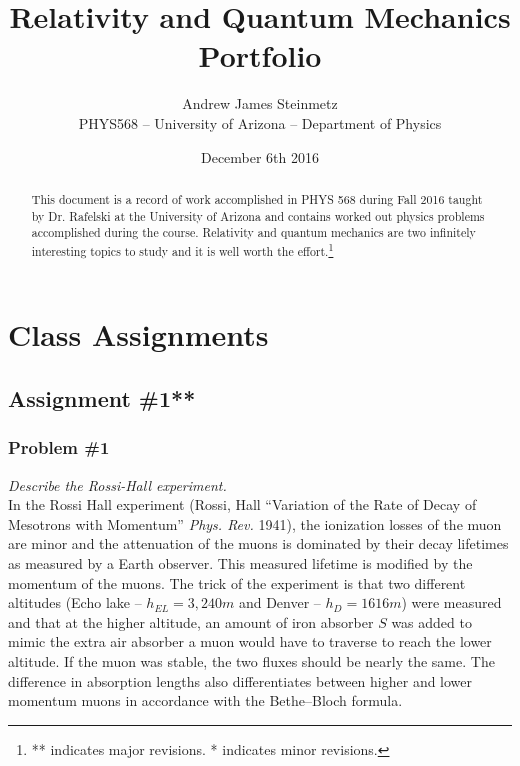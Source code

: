 \documentclass[]{article}
\numberwithin{equation}{subsection}
\begin{document}
\linespread{0.5}

\title{Relativity and Quantum Mechanics Portfolio}
\author{Andrew James Steinmetz\\ PHYS568 -- University of Arizona -- Department of Physics}
\date{December 6th 2016}
\maketitle
\renewcommand{\abstractname}{Foreword}
\begin{abstract}
This document is a record of work accomplished in PHYS 568 during Fall 2016 taught by Dr. Rafelski at the University of Arizona and contains worked out physics problems accomplished during the course. Relativity and quantum mechanics are two infinitely interesting topics to study and it is well worth the effort.\let\thefootnote\relax\footnote{** indicates major revisions. * indicates minor revisions.}

\end{abstract}
\tableofcontents
\section{Class Assignments}
\subsection{Assignment \#1**}
\subsubsection*{Problem \#1}
\emph{Describe the Rossi-Hall experiment.}\\

\noindent In the Rossi Hall experiment (Rossi, Hall ``Variation of the Rate of Decay of Mesotrons with Momentum'' \emph{Phys. Rev.} 1941), the ionization losses of the muon are minor and the attenuation of the muons is dominated by their decay lifetimes as measured by a Earth observer. This measured lifetime is modified by the momentum of the muons. The trick of the experiment is that two different altitudes (Echo lake -- $h_{EL}=3,240m$ and Denver -- $h_{D}=1616m$) were measured and that at the higher altitude, an amount of iron absorber $S$ was added to mimic the extra air absorber a muon would have to traverse to reach the lower altitude. If the muon was stable, the two fluxes should be nearly the same. The difference in absorption lengths also differentiates between higher and lower momentum muons in accordance with the Bethe--Bloch formula.
\end{document}
